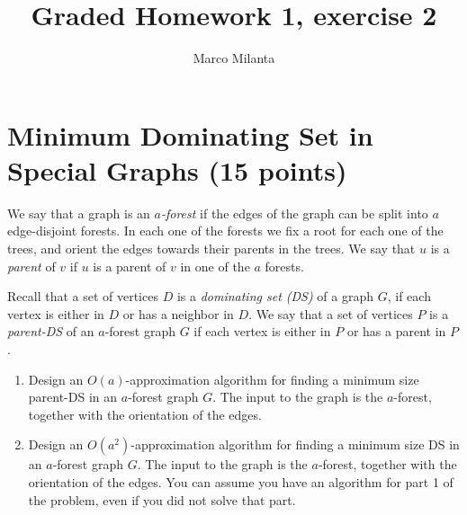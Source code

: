 \documentclass[11pt]{article}
\begin{document}
\author{Marco Milanta}
\title{Graded Homework 1, exercise 2}
\maketitle


\section*{Minimum Dominating Set in Special Graphs (15 points)}
We say that a graph is an \emph{$a$-forest} if the edges of the graph can be split into $a$ edge-disjoint forests. In each one of the forests we fix a root for each one of the trees, and orient the edges towards their parents in the trees. We say that $u$ is a \emph{parent} of $v$ if $u$ is a parent of $v$ in one of the $a$ forests. 

Recall that a set of vertices $D$ is a \emph{dominating set (DS)} of a graph $G$, if each vertex is either in $D$ or has a neighbor in $D$.
We say that a set of vertices $P$ is a \emph{parent-DS} of an $a$-forest graph $G$ if each vertex is either in $P$ or has a parent in $P$.

\begin{enumerate}
    \item Design an $O(a)$-approximation algorithm for finding a minimum size parent-DS in an $a$-forest graph $G$. The input to the graph is the $a$-forest, together with the orientation of the edges.
    \item Design an $O(a^2)$-approximation algorithm for finding a minimum size DS in an $a$-forest graph $G$. The input to the graph is the $a$-forest, together with the orientation of the edges. You can assume you have an algorithm for part 1 of the problem, even if you did not solve that part.
\end{enumerate}
\end{document}

